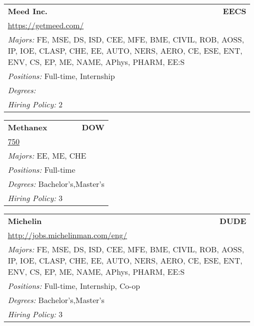 \documentclass[twoside]{article}
\begin{document}
\begin{center}
\begin{multicols}{3}
\begin{FlushLeft}
\begin{minipage}{.9\columnwidth}\begin{tabularx}{.95\columnwidth}{Xr}
                 {\Large\bf Meed Inc.} & {\Large\bf EECS}\\
    \multicolumn{2}{p{.95\columnwidth}}{\url{https://getmeed.com/}}\\
    \multicolumn{2}{p{.95\columnwidth}}{\emph{Majors:} FE, MSE, DS, ISD, CEE, MFE, BME, CIVIL, ROB, AOSS, IP, IOE, CLASP, CHE, EE, AUTO, NERS, AERO, CE, ESE, ENT, ENV, CS, EP, ME, NAME, APhys, PHARM, EE:S}\\
    \multicolumn{2}{p{.95\columnwidth}}{\emph{Positions:} Full-time, Internship}\\
    \multicolumn{2}{p{.95\columnwidth}}{\emph{Degrees:} }\\
    \multicolumn{2}{p{.95\columnwidth}}{\emph{Hiring Policy:} 2}\\
    \end{tabularx}
    
\end{minipage}
 
\begin{minipage}{.9\columnwidth}\begin{tabularx}{.95\columnwidth}{Xr}
                 {\Large\bf Methanex} & {\Large\bf DOW}\\
    \multicolumn{2}{p{.95\columnwidth}}{\url{750}}\\
    \multicolumn{2}{p{.95\columnwidth}}{\emph{Majors:} EE, ME, CHE}\\
    \multicolumn{2}{p{.95\columnwidth}}{\emph{Positions:} Full-time}\\
    \multicolumn{2}{p{.95\columnwidth}}{\emph{Degrees:} Bachelor's,Master's}\\
    \multicolumn{2}{p{.95\columnwidth}}{\emph{Hiring Policy:} 3}\\
    \end{tabularx}
    
\end{minipage}
 
\begin{minipage}{.9\columnwidth}\begin{tabularx}{.95\columnwidth}{Xr}
                 {\Large\bf Michelin} & {\Large\bf DUDE}\\
    \multicolumn{2}{p{.95\columnwidth}}{\url{http://jobs.michelinman.com/eng/}}\\
    \multicolumn{2}{p{.95\columnwidth}}{\emph{Majors:} FE, MSE, DS, ISD, CEE, MFE, BME, CIVIL, ROB, AOSS, IP, IOE, CLASP, CHE, EE, AUTO, NERS, AERO, CE, ESE, ENT, ENV, CS, EP, ME, NAME, APhys, PHARM, EE:S}\\
    \multicolumn{2}{p{.95\columnwidth}}{\emph{Positions:} Full-time, Internship, Co-op}\\
    \multicolumn{2}{p{.95\columnwidth}}{\emph{Degrees:} Bachelor's,Master's}\\
    \multicolumn{2}{p{.95\columnwidth}}{\emph{Hiring Policy:} 3}\\
    \end{tabularx}
    

\end{minipage}
\end{FlushLeft}
\end{multicols}
\end{center}
\end{document}
